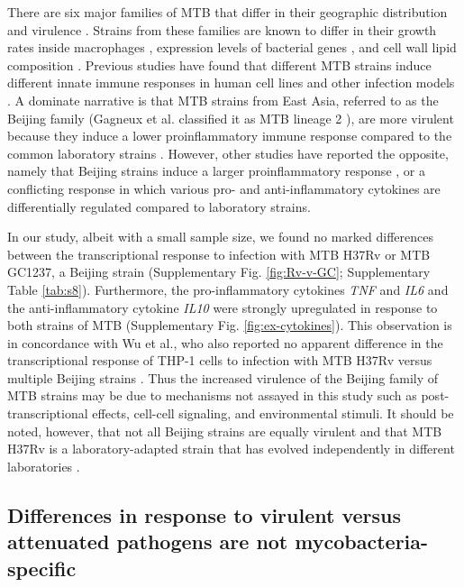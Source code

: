 There are six major families of MTB that differ in their geographic
distribution and virulence \citep{Gagneux2006, Comas2009}. Strains from
these families are known to differ in their growth rates inside
macrophages \citep{Li2002}, expression levels of bacterial genes
\citep{Homolka2010, Rose2013}, and cell wall lipid composition
\citep{Krishnan2011}. Previous studies have found that different MTB
strains induce different innate immune responses in human cell lines and
other infection models \citep{Coscolla2010}. A dominate narrative is that
MTB strains from East Asia, referred to as the Beijing family (Gagneux
et al. classified it as MTB lineage 2 \citep{Gagneux2006}), are more
virulent because they induce a lower proinflammatory immune response
compared to the common laboratory strains \citep{Manca2001, Manca2004,
Reed2004, Tanveer2009, Wang2010b}. However, other studies have
reported the opposite, namely that Beijing strains induce a larger
proinflammatory response \citep{Chacon-Salinas2005}, or a conflicting
response in which various pro- and anti-inflammatory cytokines are
differentially regulated \citep{Rocha-Ramirez2008, Koo2012} compared to
laboratory strains.

In our study, albeit with a small sample size, we found no marked
differences between the transcriptional response to infection with MTB
H37Rv or MTB GC1237, a Beijing strain (Supplementary Fig. \ref{fig:Rv-v-GC};
Supplementary Table \ref{tab:s8}). Furthermore, the pro-inflammatory cytokines
\emph{TNF} and \emph{IL6} and the anti-inflammatory cytokine \emph{IL10}
were strongly upregulated in response to both strains of MTB
(Supplementary Fig. \ref{fig:ex-cytokines}). This observation is in concordance with Wu et
al., who also reported no apparent difference in the transcriptional
response of THP-1 cells to infection with MTB H37Rv versus multiple
Beijing strains \citep{Wu2012}. Thus the increased virulence of the
Beijing family of MTB strains may be due to mechanisms not assayed in
this study such as post-transcriptional effects, cell-cell signaling,
and environmental stimuli. It should be noted, however, that not all
Beijing strains are equally virulent \citep{Dormans2004, Sinsimer2008}
and that MTB H37Rv is a laboratory-adapted strain that has evolved
independently in different laboratories \citep{Ioerger2010}.

\subsection{Differences in response to virulent versus attenuated
pathogens are not
mycobacteria-specific}\label{differences-in-response-to-virulent-versus-attenuated-pathogens-are-not-mycobacteria-specific}

